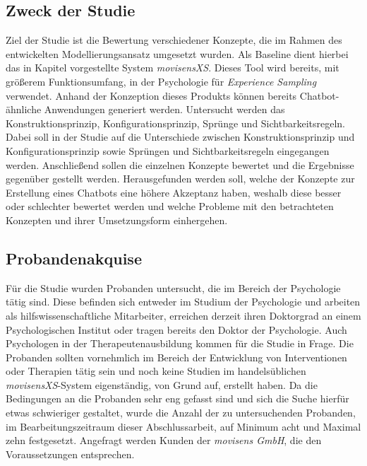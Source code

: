 \subsection{Zweck der Studie}
Ziel der Studie ist die Bewertung verschiedener Konzepte, die im Rahmen des entwickelten Modellierungsansatz umgesetzt wurden. Als Baseline dient hierbei das in Kapitel  vorgestellte System \emph{movisensXS}. Dieses Tool wird bereits, mit größerem Funktionsumfang, in der Psychologie für \emph{Experience Sampling} verwendet. Anhand der Konzeption dieses Produkts können bereits Chatbot-ähnliche Anwendungen generiert werden. Untersucht werden das Konstruktionsprinzip, Konfigurationsprinzip, Sprünge und Sichtbarkeitsregeln. Dabei soll in der Studie auf die Unterschiede zwischen Konstruktionsprinzip und Konfigurationsprinzip sowie Sprüngen und Sichtbarkeitsregeln eingegangen werden. Anschließend sollen die einzelnen Konzepte bewertet und die Ergebnisse gegenüber gestellt werden. Herausgefunden werden soll, welche der Konzepte zur Erstellung eines Chatbots eine höhere Akzeptanz haben, weshalb diese besser oder schlechter bewertet werden und welche Probleme mit den betrachteten Konzepten und ihrer Umsetzungsform einhergehen. 

\subsection{Probandenakquise}
Für die Studie wurden Probanden untersucht, die im Bereich der Psychologie tätig sind. Diese befinden sich entweder im Studium der Psychologie und arbeiten als hilfswissenschaftliche Mitarbeiter, erreichen derzeit ihren Doktorgrad an einem Psychologischen Institut oder tragen bereits den Doktor der Psychologie. Auch Psychologen in der Therapeutenausbildung kommen für die Studie in Frage. Die Probanden sollten vornehmlich im Bereich der Entwicklung von Interventionen oder Therapien tätig sein und noch keine Studien im handelsüblichen \emph{movisensXS}-System eigenständig, von Grund auf, erstellt haben. Da die Bedingungen an die Probanden sehr eng gefasst sind und sich die Suche hierfür etwas schwieriger gestaltet, wurde die Anzahl der zu untersuchenden Probanden, im Bearbeitungszeitraum dieser Abschlussarbeit, auf Minimum acht und Maximal zehn festgesetzt. Angefragt werden Kunden der \emph{movisens GmbH}, die den Voraussetzungen entsprechen. 


